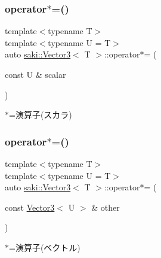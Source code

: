 \subsubsection{\texorpdfstring{operator$\ast$=()}{operator*=()}\hspace{0.1cm}{\footnotesize\ttfamily [1/2]}}
{\footnotesize\ttfamily template$<$typename T$>$ \\
template$<$typename U  = T$>$ \\
auto \mbox{\hyperlink{classsaki_1_1_vector3}{saki\+::\+Vector3}}$<$ T $>$\+::operator$\ast$= (\begin{DoxyParamCaption}\item[{const U \&}]{scalar }\end{DoxyParamCaption})\hspace{0.3cm}{\ttfamily [inline]}}



$\ast$=演算子(スカラ) 

\mbox{\label{classsaki_1_1_vector3_a7c68761dd40e55adf0dd8373c2b0e1a7}} 
\subsubsection{\texorpdfstring{operator$\ast$=()}{operator*=()}\hspace{0.1cm}{\footnotesize\ttfamily [2/2]}}
{\footnotesize\ttfamily template$<$typename T$>$ \\
template$<$typename U  = T$>$ \\
auto \mbox{\hyperlink{classsaki_1_1_vector3}{saki\+::\+Vector3}}$<$ T $>$\+::operator$\ast$= (\begin{DoxyParamCaption}\item[{const \mbox{\hyperlink{classsaki_1_1_vector3}{Vector3}}$<$ U $>$ \&}]{other }\end{DoxyParamCaption})\hspace{0.3cm}{\ttfamily [inline]}}



$\ast$=演算子(ベクトル) 

\mbox{\label{classsaki_1_1_vector3_abd44b15228ed5ac36726acf4952b220e}} 
